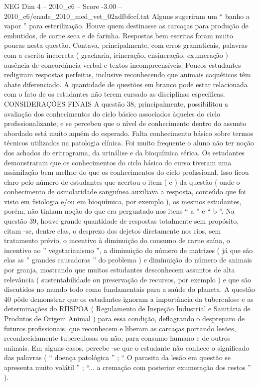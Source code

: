 \begin{textsample}{NEG Dim 4 – 2010\_c6 – Score -3.00 – 2010\_c6/enade\_2010\_med\_vet\_02adfbfccf.txt}
Alguns sugeriram um “ banho a vapor ” para esterilização.
Houve quem destinasse as carcaças para produção de embutidos, de carne seca e de farinha.
Respostas bem escritas foram muito poucas nesta questão.
Contava, principalmente, com erros gramaticais, palavras com a escrita incorreta ( gracharia, icineração, ensineração, exumeração ) ausência de concordância verbal e textos incompreensíveis.
Poucos estudantes redigiram respostas perfeitas, inclusive reconhecendo que animais caquéticos têm abate diferenciado.
A quantidade de questões em branco pode estar relacionada com o fato de os estudantes não terem cursado as disciplinas específicas.
CONSIDERAÇÕES FINAIS A questão 38, principalmente, possibilitou a avaliação dos conhecimentos do ciclo básico associados àqueles do ciclo profissionalizante, e se percebeu que o nível de conhecimento dentro do assunto abordado está muito aquém do esperado.
Falta conhecimento básico sobre termos técnicos utilizados na patologia clínica.
Foi muito frequente o aluno não ter noção dos achados do eritrograma, da urinálise e da bioquímica sérica.
Os estudantes demonstraram que os conhecimentos do ciclo básico do curso tiveram uma assimilação bem melhor do que os conhecimentos do ciclo profissional.
Isso ficou claro pelo número de estudantes que acertou o item ( c ) da questão ( onde o conhecimento de osmolaridade sanguínea auxiliava a resposta, conteúdo que foi visto em fisiologia e/ou em bioquímica, por exemplo ), os mesmos estudantes, porém, não tinham noção do que era perguntado nos itens “ a ” e “ b ”.
Na questão 39, houve grande quantidade de respostas totalmente sem propósito, citam -se, dentre elas, o desprezo dos dejetos diretamente nos rios, sem tratamento prévio, o incentivo à diminuição do consumo de carne suína, o incentivo ao ” vegetarianismo ”, a diminuição do número de matrizes ( já que são elas as ” grandes causadoras ” do problema ) e diminuição do número de animais por granja, mostrando que muitos estudantes desconhecem assuntos de alta relevância ( sustentabilidade ou preservação de recursos, por exemplo ) e que são discutidos no mundo todo como fundamentais para a saúde do planeta.
A questão 40 pôde demonstrar que os estudantes ignoram a importância da tuberculose e as determinações do RIISPOA ( Regulamento de Inspeção Industrial e Sanitária de Produtos de Origem Animal ) para essa condição, deflagrando o despreparo de futuros profissionais, que reconhecem e liberam as carcaças portando lesões, reconhecidamente tuberculosas ou não, para consumo humano e de outros animais.
Em alguns casos, percebe -se que o estudante não conhece o significado das palavras ( “ doença patológica ” ; “ O parasita da lesão em questão se apresenta muito volátil ” ; “... a cremação com posterior exumeração dos restos ” ).

\end{textsample}

